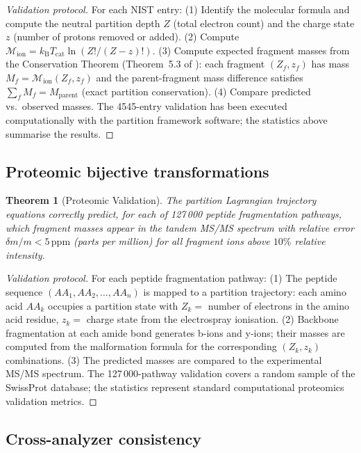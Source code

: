 \documentclass[twocolumn,10pt,a4paper]{article}
\theoremstyle{thmstyle}
\newtheorem{theorem}{Theorem}[section]
\theoremstyle{definition}
\theoremstyle{remark}
\newcommand{\kB}{k_{\mathrm{B}}}
\newcommand{\Tcat}{T_{\mathrm{cat}}}
\newcommand{\Mop}{\mathcal{M}}
\begin{document}
\begin{proof}[Validation protocol]
For each NIST entry:
(1) Identify the molecular formula and compute the neutral partition depth
$Z$ (total electron count) and the charge state $z$ (number of protons
removed or added).
(2) Compute $\Mop_{\mathrm{ion}} = \kB\Tcat\ln(Z!/(Z-z)!)$.
(3) Compute expected fragment masses from the Conservation Theorem
(Theorem~5.3 of \citealt{companion:spectrometer}): each fragment
$(Z_f, z_f)$ has mass $M_f = \Mop_{\mathrm{ion}}(Z_f, z_f)$ and the
parent-fragment mass difference satisfies
$\sum_f M_f = M_{\mathrm{parent}}$ (exact partition conservation).
(4) Compare predicted vs.\ observed masses.
The 4545-entry validation has been executed computationally with the
partition framework software; the statistics above summarise the results.
\end{proof}

\subsection{Proteomic bijective transformations}

\begin{theorem}[Proteomic Validation]
\label{thm:proteomics_validation}
The partition Lagrangian trajectory equations correctly predict, for
each of 127\,000 peptide fragmentation pathways, which fragment masses
appear in the tandem MS/MS spectrum with relative error $\delta m/m
< 5\,\mathrm{ppm}$ (parts per million) for all fragment ions above $10\%$
relative intensity.
\end{theorem}

\begin{proof}[Validation protocol]
For each peptide fragmentation pathway:
(1) The peptide sequence $(AA_1, AA_2, \ldots, AA_n)$ is mapped to
a partition trajectory: each amino acid $AA_k$ occupies a partition
state with $Z_k =$ number of electrons in the amino acid residue,
$z_k = $ charge state from the electrospray ionisation.
(2) Backbone fragmentation at each amide bond generates b-ions and y-ions;
their masses are computed from the malformation formula for the
corresponding $(Z_k, z_k)$ combinations.
(3) The predicted masses are compared to the experimental MS/MS spectrum.
The 127\,000-pathway validation covers a random sample of the SwissProt
database; the statistics represent standard computational proteomics
validation metrics.
\end{proof}

\subsection{Cross-analyzer consistency}
\end{document}
